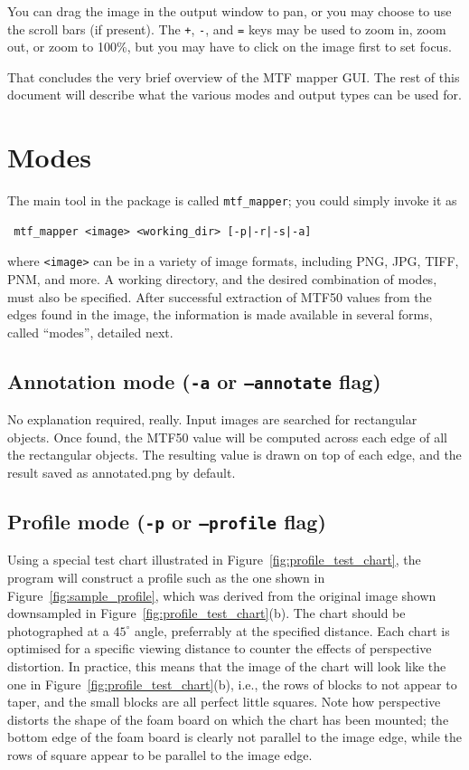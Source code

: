 \documentclass[a4paper]{article}
\begin{document}
You can drag the image in the output window to pan, or you may choose to use
the scroll bars (if present). The \verb-+-, \verb+-+, and \verb+=+ keys may
be used to zoom in, zoom out, or zoom to 100\%, but you may have to click on
the image first to set focus.

That concludes the very brief overview of the MTF mapper GUI. The rest of
this document will describe what the various modes and output types can be
used for.

\section{Modes}
The main tool in the package is called \texttt{mtf\_mapper}; you could simply
invoke it as 
\begin{verbatim} mtf_mapper <image> <working_dir> [-p|-r|-s|-a]
\end{verbatim}
where \texttt{<image>} can be in a variety of image formats, including 
PNG, JPG, TIFF, PNM, and more. A working directory, and the desired
combination of modes, must also be specified.
After successful extraction of MTF50 values from the edges found in 
the image, the information is made available in several forms, called 
``modes'', detailed next.

\subsection{Annotation mode (\texttt{-a} or \texttt{--annotate} flag)}
\label{sec:annotation_mode}
No explanation required, really. Input images are searched for rectangular
objects. Once found, the MTF50 value will be computed across each edge of
all the rectangular objects. The resulting value is drawn on top of each
edge, and the result saved as \textrm{annotated.png} by default.

\subsection{Profile mode (\texttt{-p} or \texttt{--profile} flag)}
\label{sec:profile_mode}
Using a special test chart illustrated in Figure~\ref{fig:profile_test_chart}, 
the program will construct a profile such as the one shown in 
Figure~\ref{fig:sample_profile}, which was derived from the original image
shown downsampled in Figure~\ref{fig:profile_test_chart}(b). The chart should
be photographed at a $45^\circ$ angle, preferrably at the specified
distance. Each chart is optimised for a specific viewing distance to counter
the effects of perspective distortion. In practice, this means that the
image of the chart will look like the one in
Figure~\ref{fig:profile_test_chart}(b), i.e., the rows of blocks to not
appear to taper, and the small blocks are all perfect little squares. Note
how perspective distorts the shape of the foam board on which the chart has
been mounted; the bottom edge of the foam board is clearly not parallel to
the image edge, while the rows of square appear to be parallel to the image
edge.
\end{document}
